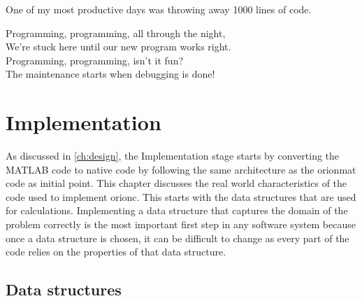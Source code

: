 
\begin{savequote}[0.55\linewidth]
	\begin{fancyquote}
	One of my most productive days was throwing away 1000 lines of code.
	\end{fancyquote}
	\begin{fancyquote}
		Programming, programming, all through the night,\\
		We're stuck here until our new program works right.\\
		Programming, programming, isn't it fun?\\
		The maintenance starts when debugging is done!
	\end{fancyquote}
\end{savequote}
\chapter{Implementation}\label{ch:implementation}

As discussed in \cref{ch:design}, the Implementation stage starts by converting
the MATLAB code to native code by following the same architecture as the
\gls{orionmat} code as initial point. This chapter discusses the real world
characteristics of the code used to implement \gls{orionc}.
This starts with the data structures that are used for calculations.
Implementing a data structure that captures the domain of the problem correctly
is the most important first step in any software system because once a data
structure is chosen, it can be difficult to change as every part of the code
relies on the properties of that data structure.

\section{Data structures}\label{subsec:impl:ds}


